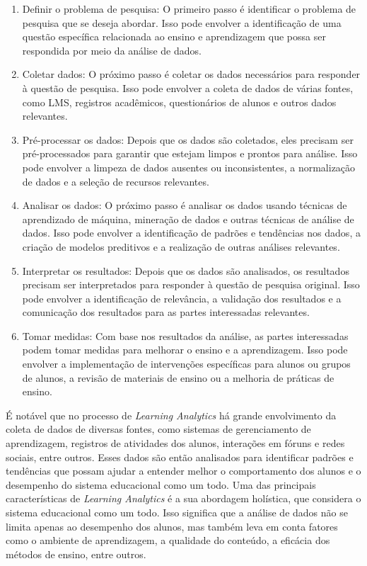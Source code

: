 \begin{enumerate}
    \item {Definir o problema de pesquisa: O primeiro passo é identificar o problema de pesquisa que se deseja abordar. Isso pode envolver a identificação de uma questão específica relacionada ao ensino e aprendizagem que possa ser respondida por meio da análise de dados.}
    \item {Coletar dados: O próximo passo é coletar os dados necessários para responder à questão de pesquisa. Isso pode envolver a coleta de dados de várias fontes, como LMS, registros acadêmicos, questionários de alunos e outros dados relevantes.}
    \item {Pré-processar os dados: Depois que os dados são coletados, eles precisam ser pré-processados para garantir que estejam limpos e prontos para análise. Isso pode envolver a limpeza de dados ausentes ou inconsistentes, a normalização de dados e a seleção de recursos relevantes.}
    \item {Analisar os dados: O próximo passo é analisar os dados usando técnicas de aprendizado de máquina, mineração de dados e outras técnicas de análise de dados. Isso pode envolver a identificação de padrões e tendências nos dados, a criação de modelos preditivos e a realização de outras análises relevantes.}
    \item {Interpretar os resultados: Depois que os dados são analisados, os resultados precisam ser interpretados para responder à questão de pesquisa original. Isso pode envolver a identificação de relevância, a validação dos resultados e a comunicação dos resultados para as partes interessadas relevantes.}
    \item {Tomar medidas: Com base nos resultados da análise, as partes interessadas podem tomar medidas para melhorar o ensino e a aprendizagem. Isso pode envolver a implementação de intervenções específicas para alunos ou grupos de alunos, a revisão de materiais de ensino ou a melhoria de práticas de ensino.}
    
\end{enumerate}

{É notável que no processo de \textit{Learning Analytics} há grande envolvimento da coleta de dados de diversas fontes, como sistemas de gerenciamento de aprendizagem, registros de atividades dos alunos, interações em fóruns e redes sociais, entre outros. Esses dados são então analisados para identificar padrões e tendências que possam ajudar a entender melhor o comportamento dos alunos e o desempenho do sistema educacional como um todo. Uma das principais características de \textit{Learning Analytics} é a sua abordagem holística, que considera o sistema educacional como um todo. Isso significa que a análise de dados não se limita apenas ao desempenho dos alunos, mas também leva em conta fatores como o ambiente de aprendizagem, a qualidade do conteúdo, a eficácia dos métodos de ensino, entre outros.}


